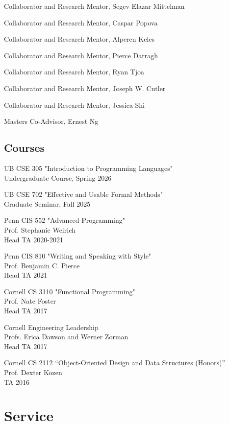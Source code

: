 \documentclass[a4paper]{article}
\begin{document}
\noindent Collaborator and Research Mentor, Segev Elazar Mittelman

\bigskip
\noindent Collaborator and Research Mentor, Caspar Popova

\bigskip
\noindent Collaborator and Research Mentor, Alperen Keles

\bigskip
\noindent Collaborator and Research Mentor, Pierce Darragh

\bigskip
\noindent Collaborator and Research Mentor, Ryan Tjoa

\bigskip
\noindent Collaborator and Research Mentor, Joseph W. Cutler

\bigskip
\noindent Collaborator and Research Mentor, Jessica Shi

\bigskip
\noindent Masters Co-Advisor, Ernest Ng


\subsection*{Courses}

\noindent UB CSE 305 "Introduction to Programming Languages" \\
Undergraduate Course, Spring 2026

\bigskip
\noindent UB CSE 702 "Effective and Usable Formal Methods" \\
Graduate Seminar, Fall 2025

\bigskip
\noindent Penn CIS 552 "Advanced Programming" \\
Prof. Stephanie Weirich \\
Head TA 2020-2021

\bigskip
\noindent Penn CIS 810 "Writing and Speaking with Style" \\
Prof. Benjamin C. Pierce \\
Head TA 2021

\bigskip
\noindent Cornell CS 3110 "Functional Programming" \\
Prof. Nate Foster \\
Head TA 2017

\bigskip
\noindent Cornell Engineering Leadership \\
Profs. Erica Dawson and Werner Zorman \\
Head TA 2017

\bigskip
\noindent Cornell CS 2112 “Object-Oriented Design and Data Structures (Honors)” \\
Prof. Dexter Kozen \\
TA 2016

\section*{Service}
\end{document}
